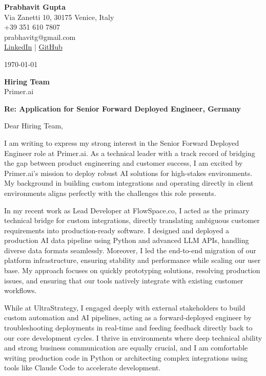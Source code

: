 \documentclass[11pt,a4paper]{article}
\begin{document}
\begin{flushleft}
\textbf{Prabhavit Gupta}\\
Via Zanetti 10, 30175 Venice, Italy\\
+39 351 610 7807\\
prabhavitg@gmail.com\\
\href{https://www.linkedin.com/in/prabhavit/}{LinkedIn} | \href{https://github.com/prab-gupta}{GitHub}
\end{flushleft}

\vspace{1em}
\today

\vspace{1em}
\textbf{Hiring Team}\\
Primer.ai

\vspace{1em}
\textbf{Re: Application for Senior Forward Deployed Engineer, Germany}

\vspace{1em}
Dear Hiring Team,

I am writing to express my strong interest in the Senior Forward Deployed Engineer role at Primer.ai. As a technical leader with a track record of bridging the gap between product engineering and customer success, I am excited by Primer.ai's mission to deploy robust AI solutions for high-stakes environments. My background in building custom integrations and operating directly in client environments aligns perfectly with the challenges this role presents.

In my recent work as Lead Developer at FlowSpace.co, I acted as the primary technical bridge for custom integrations, directly translating ambiguous customer requirements into production-ready software. I designed and deployed a production AI data pipeline using Python and advanced LLM APIs, handling diverse data formats seamlessly. Moreover, I led the end-to-end migration of our platform infrastructure, ensuring stability and performance while scaling our user base. My approach focuses on quickly prototyping solutions, resolving production issues, and ensuring that our tools natively integrate with existing customer workflows.

While at UltraStrategy, I engaged deeply with external stakeholders to build custom automation and AI pipelines, acting as a forward-deployed engineer by troubleshooting deployments in real-time and feeding feedback directly back to our core development cycles. I thrive in environments where deep technical ability and strong business communication are equally crucial, and I am comfortable writing production code in Python or architecting complex integrations using tools like Claude Code to accelerate development.
\end{document}
